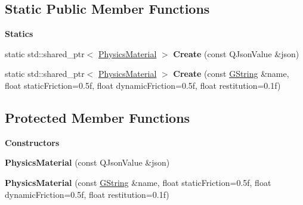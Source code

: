\subsection*{Static Public Member Functions}
\begin{Indent}\textbf{ Statics}\par
\begin{DoxyCompactItemize}
\item 
\mbox{\label{classrev_1_1_physics_material_ac7b0be5040f40efc0849e3e7128cca1d}} 
static std\+::shared\+\_\+ptr$<$ \mbox{\hyperlink{classrev_1_1_physics_material}{Physics\+Material}} $>$ {\bfseries Create} (const Q\+Json\+Value \&json)
\item 
\mbox{\label{classrev_1_1_physics_material_ade87a20c409e18693c6dc5822ea18b4a}} 
static std\+::shared\+\_\+ptr$<$ \mbox{\hyperlink{classrev_1_1_physics_material}{Physics\+Material}} $>$ {\bfseries Create} (const \mbox{\hyperlink{classrev_1_1_g_string}{G\+String}} \&name, float static\+Friction=0.\+5f, float dynamic\+Friction=0.\+5f, float restitution=0.\+1f)
\end{DoxyCompactItemize}
\end{Indent}
\subsection*{Protected Member Functions}
\begin{Indent}\textbf{ Constructors}\par
\begin{DoxyCompactItemize}
\item 
\mbox{\label{classrev_1_1_physics_material_a28504daf60a46ad0cd3d76eb961892be}} 
{\bfseries Physics\+Material} (const Q\+Json\+Value \&json)
\item 
\mbox{\label{classrev_1_1_physics_material_a94a059e1ff707eb3b9579890f18efeb8}} 
{\bfseries Physics\+Material} (const \mbox{\hyperlink{classrev_1_1_g_string}{G\+String}} \&name, float static\+Friction=0.\+5f, float dynamic\+Friction=0.\+5f, float restitution=0.\+1f)
\end{DoxyCompactItemize}
\end{Indent}
